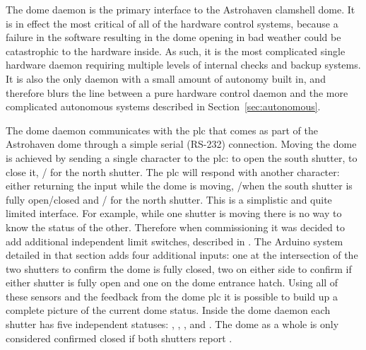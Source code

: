 \begin{colsection}
\begin{colsection}
The dome daemon is the primary interface to the Astrohaven clamshell dome. It is in effect the most critical of all of the hardware control systems, because a failure in the software resulting in the dome opening in bad weather could be catastrophic to the hardware inside. As such, it is the most complicated single hardware daemon requiring multiple levels of internal checks and backup systems. It is also the only daemon with a small amount of autonomy built in, and therefore blurs the line between a pure hardware control daemon and the more complicated autonomous systems described in Section~\ref{sec:autonomous}.

The dome daemon communicates with the \gls{plc} that comes as part of the Astrohaven dome through a simple serial (RS-232) connection. Moving the dome is achieved by sending a single character to the \gls{plc}:  to open the south shutter,  to close it, / for the north shutter. The \gls{plc} will respond with another character: either returning the input while the dome is moving, /when the south shutter is fully open/closed and / for the north shutter. This is a simplistic and quite limited interface. For example, while one shutter is moving there is no way to know the status of the other. Therefore when commissioning it was decided to add additional independent limit switches, described in . The Arduino system detailed in that section adds four additional inputs: one at the intersection of the two shutters to confirm the dome is fully closed, two on either side to confirm if either shutter is fully open and one on the dome entrance hatch. Using all of these sensors and the feedback from the dome \gls{plc} it is possible to build up a complete picture of the current dome status. Inside the dome daemon each shutter has five independent statuses: , , ,  and . The dome as a whole is only considered confirmed closed if both shutters report .


\end{colsection}
\end{colsection}
